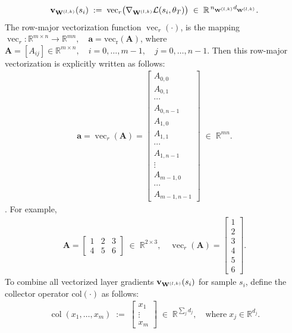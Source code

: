 \begin{align*}
    \mathbf{v}_{\mathbf{W}^{(l,k)}}(s_i)
    \;:=\;
    \operatorname{vec}_r\bigl(\nabla_{\mathbf{W}^{(l,k)}}\mathcal L(s_i,\theta_T)\bigr)
    \;\in\;\mathbb R^{\,n_{\mathbf{W}^{(l,k)}}d_{\mathbf{W}^{(l,k)}}}.
\end{align*}
The row-major vectorization function $\operatorname{vec}_r(\cdot)$, is the mapping $\operatorname{vec}_r:\mathbb{R}^{m \times n} \to \mathbb{R}^{mn}, \quad \mathbf{a} = \operatorname{vec_r}(\mathbf{A})$, where $\mathbf{A} = [A_{ij}] \in \mathbb{R}^{m \times n}, \quad i = 0, \ldots, m-1, \quad j = 0, \ldots, n-1$. Then this row-major vectorization is explicitly written as follows:
\begin{align*}
    \mathbf{a} = \operatorname{vec}_r(\mathbf A)=
    \begin{bmatrix}
    A_{0,0}\\ A_{0,1}\\ \cdots\\ A_{0,n-1}\\
    A_{1,0}\\ A_{1,1}\\ \cdots\\ A_{1,n-1}\\
    \vdots\\
    A_{m-1,0}\\ \cdots\\ A_{m-1,n-1}
    \end{bmatrix}
    \;\in\;\mathbb{R}^{mn}.
\end{align*}
\cite{curtarelli2023generalizedvectorizationinverse}. For example,
\begin{align*}
    \mathbf A=
    \begin{bmatrix}
    1 & 2 & 3\\
    4 & 5 & 6
    \end{bmatrix} \;\in\; \mathbb{R}^{2\times3}, 
    \quad 
    \operatorname{vec}_r(\mathbf A)=
    \begin{bmatrix}
    1\\2\\3\\4\\5\\6
    \end{bmatrix}.
\end{align*}
To combine all vectorized layer gradients $\mathbf{v}_{\mathbf{W}^{(l,k)}}(s_i)$ for sample $s_i$, define the collector operator $\operatorname{col(\cdot)}$ as follows:
\begin{align*}
    \operatorname{col}(x_1,\dots,x_m) \;:=\;
    \begin{bmatrix}
    x_1 \\ \vdots \\ x_m
    \end{bmatrix} \; \in \; \mathbb{R}^{\sum_{j}{d_j}}, \quad \text{where} \; x_j \in \mathbb{R}^{d_j}.
\end{align*}
